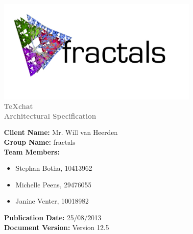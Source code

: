\documentclass[11pt,a4paper]{moderncv}
\begin{document}
		\fontsize{36pt}{36pt}\selectfont
		\begin{center}
		\includegraphics[width=10cm]{./logo2.jpg}
			\textbf{\textcolor{gray}{\\TeXchat}}
			\textbf{\textcolor{gray}{\\Architectural Specification}}
		\vspace*{\fill}
		\end{center}
		
		\fontsize{12pt}{12pt}\selectfont
		\textbf{Client Name:} Mr. Will van Heerden\\
		\textbf{Group Name:} fractals\\
		\textbf{Team Members:}
			\begin{itemize}
				\item Stephan Botha, 10413962
				\item Michelle Peens, 29476055
				\item Janine Venter, 10018982	
			\end{itemize}
		\textbf{Publication Date:} 25/08/2013\\
		\textbf{Document Version:} Version 12.5
		
\end{document}
